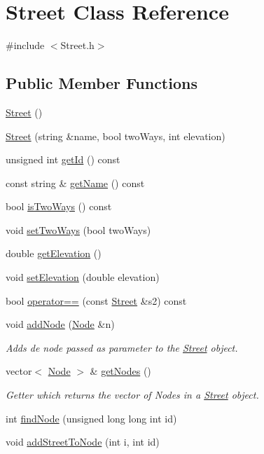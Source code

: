 \hypertarget{class_street}{}\section{Street Class Reference}
\label{class_street}


{\ttfamily \#include $<$Street.\+h$>$}

\subsection*{Public Member Functions}
\begin{DoxyCompactItemize}
\item 
\mbox{\hyperlink{class_street_a67c6b12ed40488038123d2798586a49a}{Street}} ()
\item 
\mbox{\hyperlink{class_street_a5a9d10bd309a37eebd309aefb678f2fc}{Street}} (string \&name, bool two\+Ways, int elevation)
\item 
unsigned int \mbox{\hyperlink{class_street_af5bd31425eba6d72a3c81505e720249b}{get\+Id}} () const
\item 
const string \& \mbox{\hyperlink{class_street_afcd581ec643416f80695460ca8c19c73}{get\+Name}} () const
\item 
bool \mbox{\hyperlink{class_street_a2948b1e4a058de686bd24af9fe5fa1e0}{is\+Two\+Ways}} () const
\item 
void \mbox{\hyperlink{class_street_a6539789494cff71ffab2913bbb84f7cf}{set\+Two\+Ways}} (bool two\+Ways)
\item 
double \mbox{\hyperlink{class_street_af96504bfc1730a64fec877bb08125460}{get\+Elevation}} ()
\item 
void \mbox{\hyperlink{class_street_a17e7f3ac9efd4a137e2611ae945c4c03}{set\+Elevation}} (double elevation)
\item 
bool \mbox{\hyperlink{class_street_af902ded011ecdcec196873016bfe310e}{operator==}} (const \mbox{\hyperlink{class_street}{Street}} \&s2) const
\item 
void \mbox{\hyperlink{class_street_aded0fceaaa71f5cc8223296ec7489ac7}{add\+Node}} (\mbox{\hyperlink{class_node}{Node}} \&n)
\begin{DoxyCompactList}\small\item\em Adds de node passed as parameter to the \mbox{\hyperlink{class_street}{Street}} object. \end{DoxyCompactList}\item 
vector$<$ \mbox{\hyperlink{class_node}{Node}} $>$ \& \mbox{\hyperlink{class_street_afedbedacf271f93b5105708e1afc6be6}{get\+Nodes}} ()
\begin{DoxyCompactList}\small\item\em Getter which returns the vector of Nodes in a \mbox{\hyperlink{class_street}{Street}} object. \end{DoxyCompactList}\item 
int \mbox{\hyperlink{class_street_aa35e1a8c37690c9463edc97a1d0fe60e}{find\+Node}} (unsigned long long int id)
\item 
void \mbox{\hyperlink{class_street_ad93a7342b4be921e878f60b71f2d79f9}{add\+Street\+To\+Node}} (int i, int id)
\end{DoxyCompactItemize}
